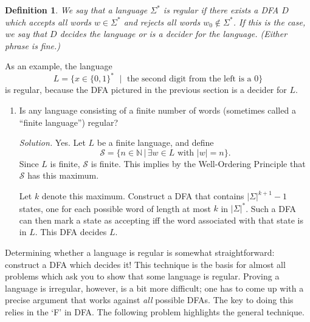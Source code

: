 \documentclass[11pt]{article}
\newtheorem{defn}{Definition}[section]
\newcounter{enum}
\newcommand{\solution}
{
\vspace{5pt}
\noindent\textit{Solution.}\qquad
}
\begin{document}
\begin{defn}We say that a language $\Sigma^*$ is \textit{regular} if there exists a DFA $D$ which accepts all words $w\in\Sigma^*$ and rejects all words $w_0\not\in\Sigma^*$.  If this is the case, we say that $D$ \textit{decides} the language or is a \textit{decider} for the language.  (Either phrase is fine.)
\end{defn}

As an example, the language \[L=\{x\in\{0,1\}^*\,\,\mid\,\,\text{the second digit from the left is a 0}\}\] is regular, because the DFA pictured in the previous section is a decider for $L$.

\begin{enumerate}

\item Is any language consisting of a finite number of words (sometimes called a ``finite language'') regular?

\solution Yes.  Let $L$ be a finite language, and define \[\mathcal{S} = \{n\in\mathbb{N}\,|\,\exists w\in L\text{ with }|w| = n\}.\] Since $L$ is finite, $\mathcal{S}$ is finite.  This implies by the Well-Ordering Principle that $\mathcal{S}$ has this maximum.

\par Let $k$ denote this maximum.  Construct a DFA that contains $|\Sigma|^{k+1}-1$ states, one for each possible word of length at most $k$ in $|\Sigma|^*$.  Such a DFA can then mark a state as accepting iff the word associated with that state is in $L$.  This DFA decides $L$.

\setcounter{enum}{\theenumi}
\end{enumerate}

\par Determining whether a language is regular is somewhat straightforward: construct a DFA which decides it!  This technique is the basis for almost all problems which ask you to show that some language is regular.  Proving a language is irregular, however, is a bit more difficult; one has to come up with a precise argument that works against \textit{all} possible DFAs.  The key to doing this relies in the `F' in DFA.  The following problem highlights the general technique.
\end{document}
